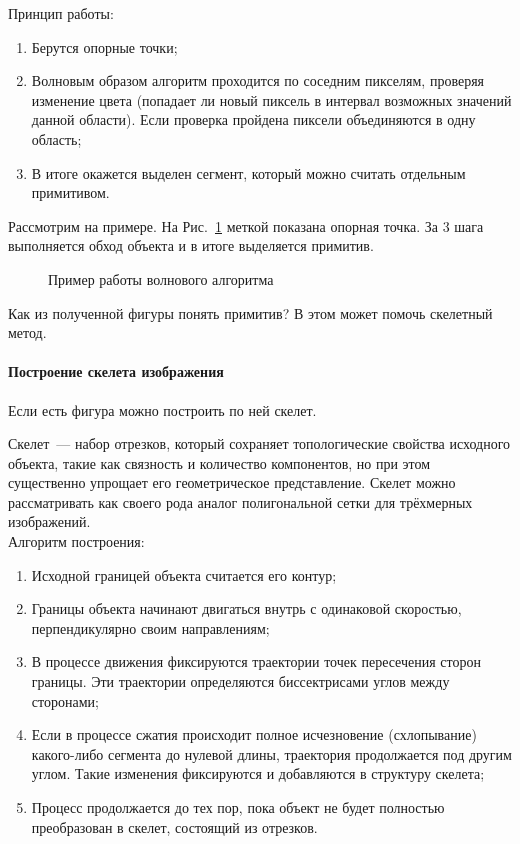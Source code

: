 Принцип работы:
\begin{enumerate}
    \item Берутся опорные точки;
    \item Волновым образом алгоритм проходится по соседним пикселям, проверяя изменение цвета (попадает ли новый пиксель в интервал возможных значений данной области). Если проверка пройдена пиксели объединяются в одну область;
    \item В итоге окажется выделен сегмент, который можно считать отдельным примитивом.
\end{enumerate}

Рассмотрим на примере. На Рис.~\ref{fig:line} меткой показана опорная точка. За 3 шага выполняется обход объекта и в итоге выделяется примитив.

\begin{figure}[h]
    \centering
    
    \caption{Пример работы волнового алгоритма}
    \label{fig:line}
\end{figure}

Как из полученной фигуры понять примитив? В этом может помочь скелетный метод.

\paragraph{Построение скелета изображения}
Если есть фигура можно построить по ней скелет.

Скелет~--- набор отрезков, который сохраняет топологические свойства исходного объекта, такие как связность и количество компонентов, но при этом существенно упрощает его геометрическое представление. Скелет можно рассматривать как своего рода аналог полигональной сетки для трёхмерных изображений.
\\

Алгоритм построения:
\begin{enumerate}
    \item Исходной границей объекта считается его контур;
    \item Границы объекта начинают двигаться внутрь с одинаковой скоростью, перпендикулярно своим направлениям;
    \item В процессе движения фиксируются траектории точек пересечения сторон границы. Эти траектории определяются биссектрисами углов между сторонами;
    \item Если в процессе сжатия происходит полное исчезновение (схлопывание) какого-либо сегмента до нулевой длины, траектория продолжается под другим углом. Такие изменения фиксируются и добавляются в структуру скелета;
    \item Процесс продолжается до тех пор, пока объект не будет полностью преобразован в скелет, состоящий из отрезков.
\end{enumerate}

